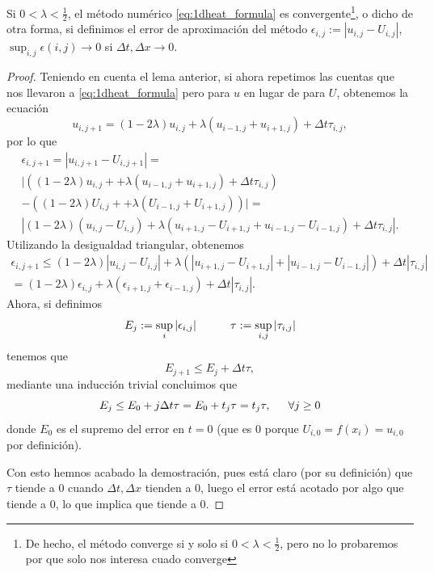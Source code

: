 \begin{teorema}
	Si $0<\lambda<\frac{1}{2}$, el método numérico \eqref{eq:1dheat_formula} es convergente\footnote{De hecho, el método converge si y solo si $0<\lambda<\frac{1}{2}$, pero no lo probaremos por que solo nos interesa cuado converge}, o dicho de otra forma, si definimos el error de aproximación del método $\epsilon_{i,j}:=|u_{i,j}-U_{i,j}|$, $\sup_{i,j}\epsilon(i,j)\rightarrow0$ si $\Delta t, \Delta x \rightarrow 0$.
\end{teorema}



\begin{proof}
	Teniendo en cuenta el lema anterior, si ahora repetimos las cuentas que nos llevaron a \eqref{eq:1dheat_formula} pero para $u$ en lugar de para $U$, obtenemos la ecuación
	\begin{equation}
		u_{i,j+1} = (1-2\lambda)u_{i,j}+\lambda(u_{i-1,j}+u_{i+1,j})+\Delta t\tau_{i,j},
	\end{equation}
	por lo que
	\begin{gather}
		\epsilon_{i,j+1} = |u_{i,j+1}-U_{i,j+1}| = \\ |((1-2\lambda)u_{i,j}++\lambda(u_{i-1,j}+u_{i+1,j})+\Delta t\tau_{i,j}) \\
		 - ((1-2\lambda)U_{i,j}++\lambda(U_{i-1,j}+U_{i+1,j}))| = \\
		 |(1-2\lambda)(u_{i,j}-U_{i,j})+\lambda(u_{i+1,j}-U_{i+1,j}+u_{i-1,j}-U_{i-1,j}) + \Delta t\tau_{i,j}|.
	\end{gather}
	Utilizando la desigualdad triangular, obtenemos
	\begin{multline}
		\epsilon_{i,j+1} \leq (1-2\lambda)|u_{i,j}-U_{i,j}|+\lambda(|u_{i+1,j}-U_{i+1,j}|+|u_{i-1,j}-U_{i-1,j}|) + \Delta t|\tau_{i,j}| \\
		= (1-2\lambda)\epsilon_{i,j}+\lambda(\epsilon_{i+1,j}+\epsilon_{i-1,j}) + \Delta t|\tau_{i,j}|.
	\end{multline}
	Ahora, si definimos
	\begin{equation}
		E_j:=\sup_{i}|\epsilon_{i,j}|\hspace{30px}\tau:=\sup_{i,j}|\tau_{i,j}|
	\end{equation}
	tenemos que
	\begin{equation}
		E_{j+1}\leq E_j+\Delta t\tau,
	\end{equation}
	mediante una inducción trivial concluimos que
	\begin{equation}
		E_j \leq E_0 + j\Delta t\tau = E_0+t_j\tau = t_j\tau,\hspace{15px}\forall j\geq0
	\end{equation}
	donde $E_0$ es el supremo del error en $t=0$ (que es $0$ porque $U_{i,0} =f(x_i)= u_{i,0}$ por definición).
	
	Con esto hemnos acabado la demostración, pues está claro (por su definición) que $\tau$ tiende a 0 cuando $\Delta t, \Delta x$ tienden a 0, luego el error está acotado por algo que tiende a 0, lo que implica que tiende a 0.
\end{proof}


